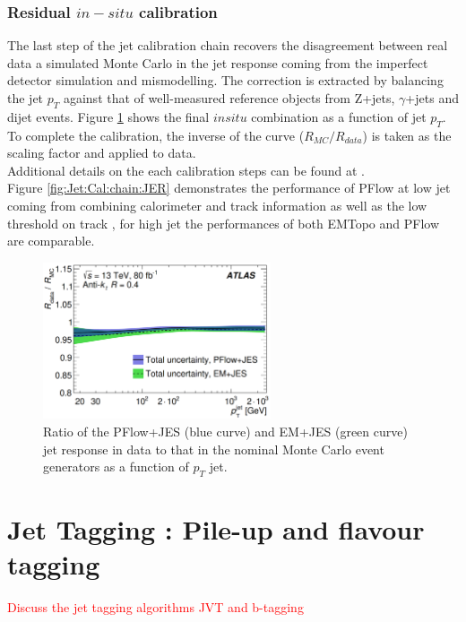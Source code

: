 \subsubsection{Residual $in-situ$ calibration}
\label{Jet:Cal:chain:InSitu}
The last step of the jet calibration chain recovers the disagreement between real data a simulated Monte Carlo in the jet response coming from the imperfect detector simulation and mismodelling. The correction is extracted by balancing the jet $p_T$ against that of well-measured reference objects from Z+jets, $\gamma$+jets and dijet events. Figure \ref{fig:Jet:Cal:chain:InSitu} shows the final $in situ$ combination as a function of jet $p_T$. To complete the calibration, the inverse of the curve ($R_{MC}/R_{data}$) is taken as the scaling factor and applied to data. \\
Additional details on the each calibration steps can be found at \cite{JES_Sys_13_TeV}. \\
Figure \ref{fig:Jet:Cal:chain:JER} demonstrates the performance of PFlow at low jet \pT coming from combining calorimeter and track information as well as the low threshold on track \pT, for high jet \pT the performances of both EMTopo and PFlow are comparable. 
\begin{figure}[htbp]
    \centering
    \includegraphics[width=0.6\textwidth]{Ch4/Img/Jet_MC_Data_Ration.png}
    \caption{Ratio of the PFlow+JES (blue curve) and EM+JES (green curve) jet response in data to that in the nominal Monte Carlo event generators as a function of $p_T$ jet.}
    \label{fig:Jet:Cal:chain:InSitu}
\end{figure}
\section{Jet Tagging : Pile-up and flavour tagging}
\label{Jet:Tag}
\textcolor{red}{Discuss the jet tagging algorithms JVT and b-tagging \\} 

